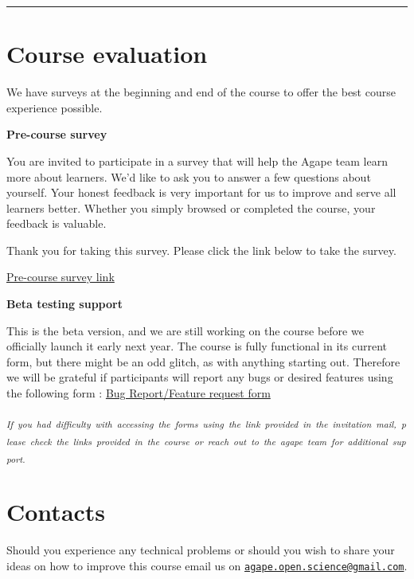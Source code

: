 \documentclass[
]{book}
\begin{document}
\begin{center}\rule{0.5\linewidth}{0.5pt}\end{center}

\hypertarget{course-evaluation}{%
\section*{Course evaluation}\label{course-evaluation}}

We have surveys at the beginning and end of the course to offer the best course experience possible.

\textbf{Pre-course survey}

You are invited to participate in a survey that will help the Agape team learn more about learners. We'd like to ask you to answer a few questions about yourself. Your honest feedback is very important for us to improve and serve all learners better. Whether you simply browsed or completed the course, your feedback is valuable.

Thank you for taking this survey. Please click the link below to take the survey.

\href{https://forms.gle/oBLgoyT6G7FvN9uR8}{Pre-course survey link}

\textbf{Beta testing support}

This is the beta version, and we are still working on the course before we officially launch it early next year. The course is fully functional in its current form, but there might be an odd glitch, as with anything starting out. Therefore we will be grateful if participants will report any bugs or desired features using the following form : \href{https://forms.gle/oBLgoyT6G7FvN9uR8}{Bug Report/Feature request form}

\textsubscript{\emph{If~you~had~difficulty~with~accessing~the~forms~using~the~link~provided~in~the~invitation~mail,~please~check~the~links~provided~in~the~course~or~reach~out~to~the~agape~team~for~additional~support.}}

\hypertarget{contacts}{%
\section*{Contacts}\label{contacts}}

Should you experience any technical problems or should you wish to share your ideas on how to improve this course email us on {\href{mailto:agape.open.science@gmail.com}{\nolinkurl{agape.open.science@gmail.com}}}.
\end{document}
